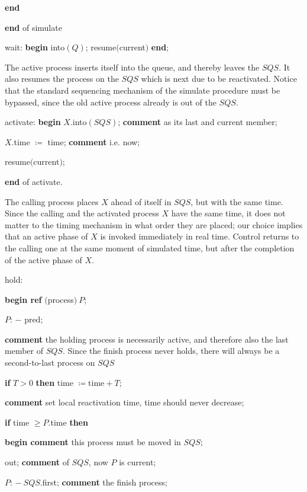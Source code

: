 \documentclass[twoside,11pt]{book}
\begin{document}
\quad \quad \quad \quad \textbf{end}

\quad \quad \textbf{end} of simulate

\quad wait: \textbf{begin} into$(Q)$; resume$($current$)$ \textbf{end};

\noindent
The active process inserts itself into the queue, and thereby leaves the $SQS$. It also resumes the process on the $SQS$ which is next due to be reactivated. Notice that the standard sequencing mechanism of the simulate procedure must be bypassed, since the old active process already is out of the $SQS$.

\quad activate: \textbf{begin} $X$.into$(SQS)$; \textbf{comment} as its last and current member;

\quad \quad $X$.time $\coloneq$ time; \textbf{comment} i.e. now;

\quad \quad resume$($current$)$;

\quad \textbf{end} of activate.

\noindent
The calling process places $X$ ahead of itself in $SQS$, but with the same time. Since the calling and the activated process $X$ have the same time, it does not matter to the timing mechanism in what order they are placed; our choice implies that an active phase of $X$ is invoked immediately in real time. Control returns to the calling one at the same moment of simulated time, but after the completion of the active phase of $X$.

\quad hold:

\quad \textbf{begin ref} $($process$)\ P$;

\quad \quad $P$: $-$ pred;

\parindent\quad \quad \textbf{comment} the holding process is necessarily active, and therefore also the last member of $SQS$. Since the finish process never holds, there will always be a second-to-last process on $SQS$

\quad \quad \textbf{if} $T > 0$ \textbf{then} time $\coloneq \text{time} + T$;

\quad \quad \textbf{comment} set local reactivation time, time should never decrease;

\quad \quad \textbf{if} time $\geqslant P$.time \textbf{then}

\quad \quad \quad \textbf{begin comment} this process must be moved in $SQS$;

\quad \quad \quad \quad out; \textbf{comment} of $SQS$, now $P$ is current;

\quad \quad \quad \quad $P$: $-\ SQS$.first; \textbf{comment} the finish process;
\end{document}
